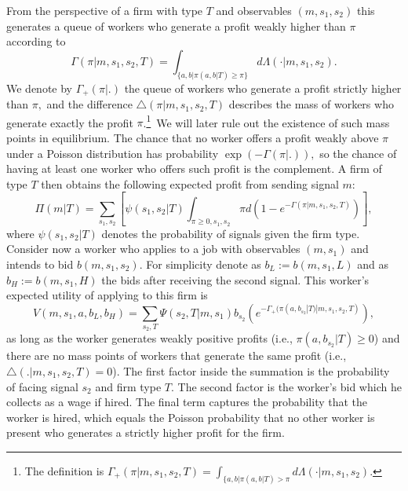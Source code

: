 \documentclass[12pt]{article}
\begin{document}
From the perspective of a firm with type $T$ and observables $%
(m,s_{1},s_{2}) $ this generates a queue of workers  who generate a profit weakly higher than 
$\pi $ according to 
\begin{equation*}
\Gamma (\pi |m,s_{1},s_{2},T)=\int_{\{a,b|\pi (a,b|T)\geq \pi \}}d\Lambda
(\cdot |m,s_{1},s_{2}).
\end{equation*}%
We denote by $\Gamma _{+}(\pi |.)$ the queue of workers who generate a profit strictly higher than $\pi ,$  and the difference $\bigtriangleup (\pi |m,s_{1},s_{2},T)$
describes the mass of workers who generate exactly the profit $\pi$.\footnote{%
The definition is $\Gamma _{+}(\pi |m,s_{1},s_{2},T)=\int_{\{a,b|\pi
(a,b|T)>\pi }d\Lambda (\cdot |m,s_{1},s_{2}).$}\ We will later rule out the
existence of such mass points in equilibrium. The chance that no worker
offers a profit weakly above $\pi $ under a Poisson distribution has
probability $\exp (-\Gamma (\pi |.)),$ so the chance of having at least one
worker who offers such profit is the complement. A firm of type $T$ then obtains the following expected profit from
sending signal $m$:
\begin{equation}
\Pi (m|T)=\sum_{s_{1},s_{2}}\left[ \psi (s_{1},s_{2}|T)\int_{\pi \geq
0,s_{1},s_{2}}\pi d(1-e^{-\Gamma (\pi |m,s_{1},s_{2},T)})\right] ,
\label{profits}
\end{equation}%
where $\psi (s_{1},s_{2}|T)$ denotes the probability of signals given the
firm type. Consider now a worker who applies to a job with observables $(m,s_{1})$ and intends to bid $b(m,s_{1},s_{2})$. For simplicity denote as $b_L:=b(m,s_{1},L)$ and as $b_H:=b(m,s_{1},H)$ the bids after receiving the second signal. This worker's expected utility of applying to this firm is%
\begin{equation}
V(m,s_{1},a,b_{L},b_{H})=\sum_{s_{2},T}\Psi (s_{2},T|m,s_{1}) b_{s_{2}} \left( e^{-\Gamma
_{+}(\pi (a,b_{s_2}|T)|m,s_{1},s_{2},T)} \right),
\label{value}
\end{equation}%
as long as the worker generates weakly positive profits (i.e., $\pi (a,b_{s_2}|T)\geq 0$) and there are no mass points of workers that generate the same profit (i.e., $\bigtriangleup (.|m,s_{1},s_{2},T)=0$). The first factor inside the summation is the probability of facing
signal $s_{2}$ and firm type $T.$ The second factor is the worker's bid which he collects as a wage if hired. The final term captures the probability that the worker is hired, which equals the Poisson probability that no other worker is present who generates a strictly higher profit for the firm. 
\end{document}

